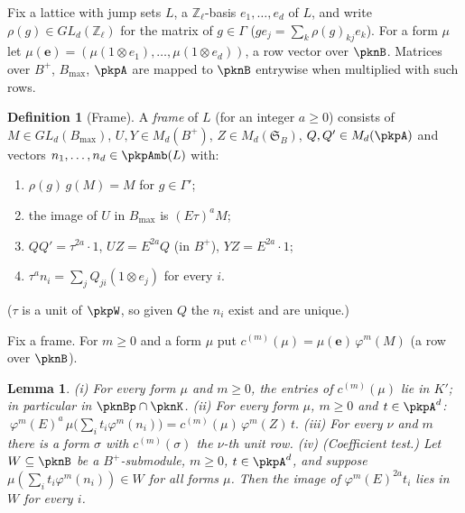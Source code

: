 \documentclass[10pt]{amsart}
\newtheorem{lemma}[theorem]{Lemma}
\theoremstyle{definition}
\newtheorem{definition}[theorem]{Definition}
\theoremstyle{remark}
\newcommand{\Z}{\mathbb Z}
\begin{document}
Fix a lattice with jump sets $L$, a $\Z_\ell$-basis $e_1,\dots,e_d$ of $L$, and write $\rho(g)\in
GL_d(\Z_\ell)$ for the matrix of $g\in\Gamma$ ($ge_j=\sum_k\rho(g)_{kj}e_k$). For a form $\mu$ let
$\mu(\mathbf e)=(\mu(1\otimes e_1),\dots,\mu(1\otimes e_d))$, a row vector over $\pknB$. Matrices over
$B^+$, $B_{\max}$, $\pkpA$ are mapped to $\pknB$ entrywise when multiplied with such rows.

\begin{definition}[Frame]\label{pkn:def-frame}
A \emph{frame} of $L$ (for an integer $a\ge0$) consists of $M\in GL_d(B_{\max})$, $U,Y\in
M_d(B^+)$, $Z\in M_d(\mathfrak S_B)$, $Q,Q'\in M_d(\pkpA)$ and vectors $n_1,\dots,n_d\in\pkpAmb(L)$ with:
\begin{enumerate}
\item[(Fr1)] $\rho(g)\,g(M)=M$ for $g\in\Gamma'$;
\item[(Fr2)] the image of $U$ in $B_{\max}$ is $(E\tau)^aM$;
\item[(Fr3)] $QQ'=\tau^{2a}\cdot1$, $UZ=E^{2a}Q$ (in $B^+$), $YZ=E^{2a}\cdot1$;
\item[(Fr4)] $\tau^an_i=\sum_jQ_{ji}(1\otimes e_j)$ for every $i$.
\end{enumerate}
\end{definition}

($\tau$ is a unit of $\pkpW$, so given $Q$ the $n_i$ exist and are unique.)

Fix a frame. For $m\ge0$ and a form $\mu$ put $c^{(m)}(\mu)=\mu(\mathbf e)\,\varphi^m(M)$ (a row over
$\pknB$).

\begin{lemma}\label{pkn:frame-id}
(i) For every form $\mu$ and $m\ge0$, the entries of $c^{(m)}(\mu)$ lie in $K'$; in particular in
$\pknBp\cap\pknK$.
(ii) For every form $\mu$, $m\ge0$ and $t\in\pkpA^d$:
$\ \varphi^m(E)^a\,\mu\bigl(\sum_it_i\varphi^m(n_i)\bigr)=c^{(m)}(\mu)\,\varphi^m(Z)\,t.$
(iii) For every $\nu$ and $m$ there is a form $\sigma$ with $c^{(m)}(\sigma)$ the $\nu$-th unit row.
(iv) (Coefficient test.) Let $W\subseteq\pknB$ be a $B^+$-submodule, $m\ge0$, $t\in\pkpA^d$, and suppose
$\mu(\sum_it_i\varphi^m(n_i))\in W$ for all forms $\mu$. Then the image of $\varphi^m(E)^{2a}t_i$ lies in
$W$ for every $i$.
\end{lemma}
\end{document}

